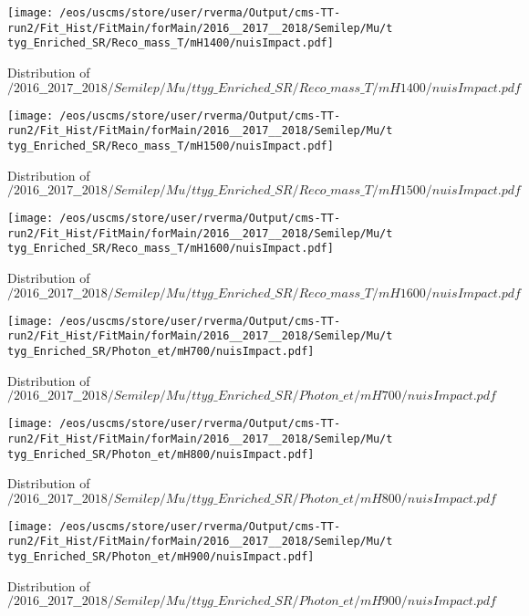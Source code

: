 \begin{figure}
\centering
\texttt{[image: /eos/uscms/store/user/rverma/Output/cms-TT-run2/Fit\_Hist/FitMain/forMain/2016\_\_2017\_\_2018/Semilep/Mu/ttyg\_Enriched\_SR/Reco\_mass\_T/mH1400/nuisImpact.pdf]}
\caption{Distribution of $/2016\_\_2017\_\_2018/Semilep/Mu/ttyg\_Enriched\_SR/Reco\_mass\_T/mH1400/nuisImpact.pdf$}
\end{figure}

\begin{figure}
\centering
\texttt{[image: /eos/uscms/store/user/rverma/Output/cms-TT-run2/Fit\_Hist/FitMain/forMain/2016\_\_2017\_\_2018/Semilep/Mu/ttyg\_Enriched\_SR/Reco\_mass\_T/mH1500/nuisImpact.pdf]}
\caption{Distribution of $/2016\_\_2017\_\_2018/Semilep/Mu/ttyg\_Enriched\_SR/Reco\_mass\_T/mH1500/nuisImpact.pdf$}
\end{figure}

\begin{figure}
\centering
\texttt{[image: /eos/uscms/store/user/rverma/Output/cms-TT-run2/Fit\_Hist/FitMain/forMain/2016\_\_2017\_\_2018/Semilep/Mu/ttyg\_Enriched\_SR/Reco\_mass\_T/mH1600/nuisImpact.pdf]}
\caption{Distribution of $/2016\_\_2017\_\_2018/Semilep/Mu/ttyg\_Enriched\_SR/Reco\_mass\_T/mH1600/nuisImpact.pdf$}
\end{figure}

\begin{figure}
\centering
\texttt{[image: /eos/uscms/store/user/rverma/Output/cms-TT-run2/Fit\_Hist/FitMain/forMain/2016\_\_2017\_\_2018/Semilep/Mu/ttyg\_Enriched\_SR/Photon\_et/mH700/nuisImpact.pdf]}
\caption{Distribution of $/2016\_\_2017\_\_2018/Semilep/Mu/ttyg\_Enriched\_SR/Photon\_et/mH700/nuisImpact.pdf$}
\end{figure}

\begin{figure}
\centering
\texttt{[image: /eos/uscms/store/user/rverma/Output/cms-TT-run2/Fit\_Hist/FitMain/forMain/2016\_\_2017\_\_2018/Semilep/Mu/ttyg\_Enriched\_SR/Photon\_et/mH800/nuisImpact.pdf]}
\caption{Distribution of $/2016\_\_2017\_\_2018/Semilep/Mu/ttyg\_Enriched\_SR/Photon\_et/mH800/nuisImpact.pdf$}
\end{figure}

\begin{figure}
\centering
\texttt{[image: /eos/uscms/store/user/rverma/Output/cms-TT-run2/Fit\_Hist/FitMain/forMain/2016\_\_2017\_\_2018/Semilep/Mu/ttyg\_Enriched\_SR/Photon\_et/mH900/nuisImpact.pdf]}
\caption{Distribution of $/2016\_\_2017\_\_2018/Semilep/Mu/ttyg\_Enriched\_SR/Photon\_et/mH900/nuisImpact.pdf$}
\end{figure}

